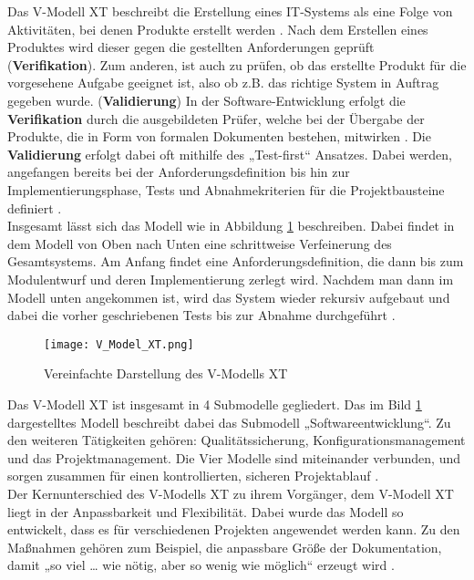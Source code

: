 Das V-Modell XT beschreibt die Erstellung eines IT-Systems als eine Folge von Aktivitäten, bei denen Produkte erstellt werden \cite[4]{Dros:1999:V:}. 
Nach dem Erstellen eines Produktes wird dieser gegen die gestellten Anforderungen geprüft (\textbf{Verifikation})\cite[107]{Frie:2009:V:}. 
Zum anderen, ist auch zu prüfen, ob das erstellte Produkt für die vorgesehene Aufgabe geeignet ist, also ob z.B. das richtige System in Auftrag gegeben wurde. (\textbf{Validierung})
In der Software-Entwicklung erfolgt die \textbf{Verifikation} durch die ausgebildeten Prüfer, welche bei der Übergabe der Produkte, 
die in Form von formalen Dokumenten bestehen, mitwirken \cite[36,37]{Hohn:2008:V:} \cite[107]{Frie:2009:V:}. 
Die \textbf{Validierung} erfolgt dabei oft mithilfe des „Test-first“ Ansatzes. Dabei werden, angefangen bereits bei der Anforderungsdefinition bis hin zur Implementierungsphase, Tests und Abnahmekriterien 
für die Projektbausteine definiert \cite[2]{Vans:2014:Software:}. 
\\Insgesamt lässt sich das Modell wie in Abbildung \ref{fig:v_model_xt} beschreiben. Dabei findet in dem Modell von Oben nach Unten eine schrittweise Verfeinerung des Gesamtsystems. 
Am Anfang findet eine Anforderungsdefinition, die dann bis zum Modulentwurf und deren Implementierung zerlegt wird. Nachdem man dann im Modell unten \glqq angekommen ist\grqq{}, 
wird das System wieder rekursiv aufgebaut und dabei die vorher geschriebenen Tests bis zur Abnahme durchgeführt \cite[93]{Goll:2011:Methoden:}\cite{Lude:2007:Software:}.  
\begin{figure}
\centering
    \texttt{[image: V\_Model\_XT.png]} 
    \caption{Vereinfachte Darstellung des V-Modells XT}
    \label{fig:v_model_xt}
\end{figure}
Das V-Modell XT ist insgesamt in 4 Submodelle gegliedert. Das im Bild \ref{fig:v_model_xt} dargestelltes Modell beschreibt dabei das Submodell „Softwareentwicklung“. 
Zu den weiteren Tätigkeiten gehören: Qualitätssicherung, Konfigurationsmanagement und das Projektmanagement. Die Vier Modelle sind miteinander verbunden, und sorgen zusammen für einen kontrollierten, 
sicheren Projektablauf \cite[6]{Frie:2009:V:} \cite[4]{Dros:1999:V:}. 
\\
Der Kernunterschied des V-Modells XT zu ihrem Vorgänger, dem V-Modell XT liegt in der Anpassbarkeit und Flexibilität. Dabei wurde das Modell so entwickelt, dass es für verschiedenen Projekten 
angewendet werden kann. Zu den Maßnahmen gehören zum Beispiel, die anpassbare Größe der Dokumentation, damit „so viel … wie nötig, aber so wenig wie möglich“ erzeugt wird \cite[3]{Frie:2009:V:}. 
